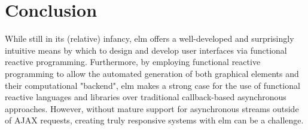 \documentclass[12pt]{article}
\begin{document}
\section{Conclusion}
While still in its (relative) infancy, elm offers a well-developed and surprisingly intuitive means by which to design and develop user interfaces via functional reactive programming. Furthermore, by employing functional reactive programming to allow the automated generation of both graphical elements and their computational "backend", elm makes a strong case for the use of functional reactive languages and libraries over traditional callback-based asynchronous approaches. However, without mature support for asynchronous streams outside of AJAX requests, creating truly responsive systems with elm can be a challenge.





\end{document}
